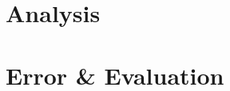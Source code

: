 \documentclass[letterpaper, 12pt]{article}
\author{Grant Lemons}
\date{\today}
\begin{document}


\section{Analysis}


\section{Error \& Evaluation}

\end{document}
